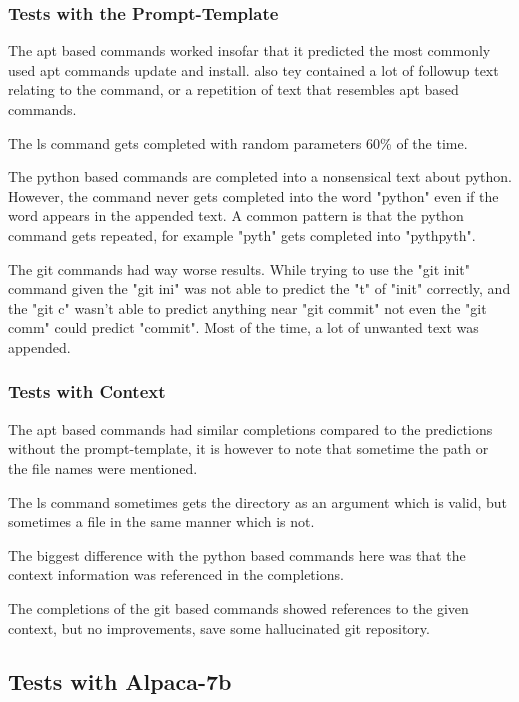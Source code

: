 \subsubsection{Tests with the Prompt-Template}

 The apt based commands  worked insofar that it predicted the most commonly used apt commands update and install. also tey contained a lot of followup text relating to the command, or a repetition of text that resembles apt based commands.


The ls command gets completed with random parameters 60\% of the time.


The python based commands are completed into a nonsensical text about python. However, the command never gets completed into the word "python" even if the word appears in the appended text. A common pattern is that the python command gets repeated, for example "pyth" gets completed into "pythpyth". 


The git commands had way worse results. While trying to use the "git init" command given the "git ini" was not able to predict the "t" of "init" correctly, and the "git c" wasn't able to predict anything near "git commit" not even  the "git comm" could predict "commit". Most of the time, a lot of unwanted text was appended. 



\subsubsection{Tests with Context}

The apt based commands had similar completions compared to the predictions without the prompt-template, it is however to note that sometime the path or the file names were mentioned.


The ls command sometimes gets the directory as an argument which is valid, but sometimes a file in the same manner which is not.


The biggest difference with the python based commands here was that the context information was referenced in the completions.


The completions of the git based commands showed references to the given context, but no improvements, save some hallucinated git repository.









\subsection{Tests with Alpaca-7b}



